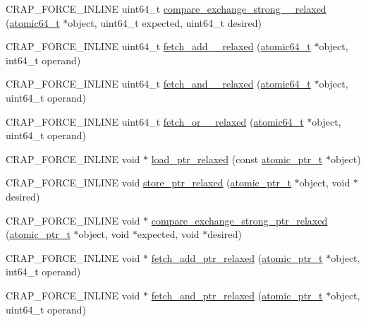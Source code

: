\begin{DoxyCompactItemize}
\item 
C\+R\+A\+P\+\_\+\+F\+O\+R\+C\+E\+\_\+\+I\+N\+L\+I\+N\+E uint64\+\_\+t \hyperlink{namespacecrap_aab28fcb5edef34423173f222b0c1775f}{compare\+\_\+exchange\+\_\+strong\+\_\+\_\+relaxed} (\hyperlink{structcrap_1_1atomic64__t}{atomic64\+\_\+t} $\ast$object, uint64\+\_\+t expected, uint64\+\_\+t desired)
\item 
C\+R\+A\+P\+\_\+\+F\+O\+R\+C\+E\+\_\+\+I\+N\+L\+I\+N\+E uint64\+\_\+t \hyperlink{namespacecrap_a74b1eeadd27dab843b99607fcd617a3b}{fetch\+\_\+add\+\_\+\_\+relaxed} (\hyperlink{structcrap_1_1atomic64__t}{atomic64\+\_\+t} $\ast$object, int64\+\_\+t operand)
\item 
C\+R\+A\+P\+\_\+\+F\+O\+R\+C\+E\+\_\+\+I\+N\+L\+I\+N\+E uint64\+\_\+t \hyperlink{namespacecrap_adfa4ba5cf8bf7e816ad7f8351dd39bff}{fetch\+\_\+and\+\_\+\_\+relaxed} (\hyperlink{structcrap_1_1atomic64__t}{atomic64\+\_\+t} $\ast$object, uint64\+\_\+t operand)
\item 
C\+R\+A\+P\+\_\+\+F\+O\+R\+C\+E\+\_\+\+I\+N\+L\+I\+N\+E uint64\+\_\+t \hyperlink{namespacecrap_af1c3b7ce6841fc87f3cd1ca8df004e11}{fetch\+\_\+or\+\_\+\_\+relaxed} (\hyperlink{structcrap_1_1atomic64__t}{atomic64\+\_\+t} $\ast$object, uint64\+\_\+t operand)
\item 
C\+R\+A\+P\+\_\+\+F\+O\+R\+C\+E\+\_\+\+I\+N\+L\+I\+N\+E void $\ast$ \hyperlink{namespacecrap_a1bda807e593bb56b1be32a0c7e11537a}{load\+\_\+ptr\+\_\+relaxed} (const \hyperlink{structcrap_1_1atomic__ptr__t}{atomic\+\_\+ptr\+\_\+t} $\ast$object)
\item 
C\+R\+A\+P\+\_\+\+F\+O\+R\+C\+E\+\_\+\+I\+N\+L\+I\+N\+E void \hyperlink{namespacecrap_a0fc644a4e7682083464c7ec99b8c94be}{store\+\_\+ptr\+\_\+relaxed} (\hyperlink{structcrap_1_1atomic__ptr__t}{atomic\+\_\+ptr\+\_\+t} $\ast$object, void $\ast$desired)
\item 
C\+R\+A\+P\+\_\+\+F\+O\+R\+C\+E\+\_\+\+I\+N\+L\+I\+N\+E void $\ast$ \hyperlink{namespacecrap_a0d7a51fdb5f2784c18fd063a0c6f9791}{compare\+\_\+exchange\+\_\+strong\+\_\+ptr\+\_\+relaxed} (\hyperlink{structcrap_1_1atomic__ptr__t}{atomic\+\_\+ptr\+\_\+t} $\ast$object, void $\ast$expected, void $\ast$desired)
\item 
C\+R\+A\+P\+\_\+\+F\+O\+R\+C\+E\+\_\+\+I\+N\+L\+I\+N\+E void $\ast$ \hyperlink{namespacecrap_a354f3fb9a13ba30612116ac432c895a1}{fetch\+\_\+add\+\_\+ptr\+\_\+relaxed} (\hyperlink{structcrap_1_1atomic__ptr__t}{atomic\+\_\+ptr\+\_\+t} $\ast$object, int64\+\_\+t operand)
\item 
C\+R\+A\+P\+\_\+\+F\+O\+R\+C\+E\+\_\+\+I\+N\+L\+I\+N\+E void $\ast$ \hyperlink{namespacecrap_ad2d918250c73ce4536f7bbf3528e92fa}{fetch\+\_\+and\+\_\+ptr\+\_\+relaxed} (\hyperlink{structcrap_1_1atomic__ptr__t}{atomic\+\_\+ptr\+\_\+t} $\ast$object, uint64\+\_\+t operand)

\end{DoxyCompactItemize}

